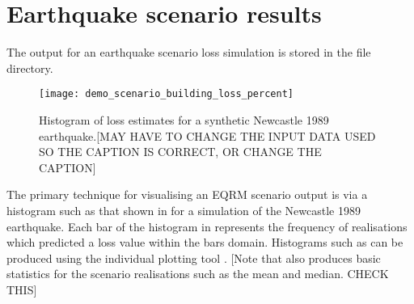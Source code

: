 \section{Earthquake scenario results}

The output for an earthquake scenario loss simulation is 
stored in the file
 directory. 
\begin{figure}
\texttt{[image: demo\_scenario\_building\_loss\_percent]}
\caption{Histogram of loss estimates for a synthetic Newcastle
1989 earthquake.[MAY HAVE TO CHANGE THE INPUT DATA USED SO THE CAPTION
IS CORRECT, OR CHANGE THE CAPTION]} \label{fig:scenario-hist}
\end{figure}
The primary technique for visualising an EQRM scenario output is
via a histogram such as that shown in  for
a simulation of the Newcastle 1989 earthquake. Each bar of the
histogram in  represents the frequency of
realisations which predicted a loss value within the bars domain.
Histograms such as  can be produced using
the individual plotting tool
.
 [Note that
 also produces basic
statistics for the scenario realisations such as the mean and
median. CHECK THIS]

